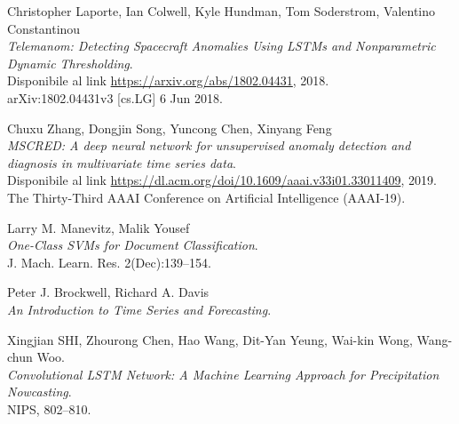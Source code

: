     


\begin{thebibliography}{4}

    Christopher Laporte, Ian Colwell, Kyle Hundman, Tom Soderstrom, Valentino Constantinou\\
    \textit{Telemanom: Detecting Spacecraft Anomalies Using LSTMs and Nonparametric Dynamic Thresholding}.\\
    Disponibile al link \url{https://arxiv.org/abs/1802.04431}, 2018.\\
    arXiv:1802.04431v3 [cs.LG] 6 Jun 2018.

    Chuxu Zhang, Dongjin Song, Yuncong Chen, Xinyang Feng\\
    \textit{MSCRED: A deep neural network for unsupervised anomaly detection and diagnosis in multivariate time series data}.\\
    Disponibile al link \url{https://dl.acm.org/doi/10.1609/aaai.v33i01.33011409}, 2019.\\
    The Thirty-Third AAAI Conference on Artificial Intelligence (AAAI-19).

    Larry M. Manevitz, Malik Yousef\\
    \textit{One-Class SVMs for Document Classification}.\\
    J. Mach. Learn. Res. 2(Dec):139–154.

    Peter J. Brockwell, Richard A. Davis\\
    \textit{An Introduction to Time Series and Forecasting}.

    Xingjian SHI, Zhourong Chen, Hao Wang, Dit-Yan Yeung, Wai-kin Wong, Wang-chun Woo.\\
    \textit{Convolutional LSTM Network: A Machine Learning Approach for Precipitation Nowcasting}.\\
    NIPS, 802–810.
    
\end{thebibliography}